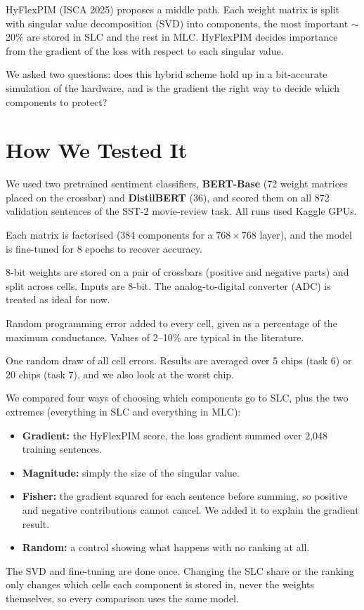 \documentclass[10pt,a4paper]{article}
\begin{document}
HyFlexPIM (ISCA 2025) proposes a middle path. Each weight matrix is split with singular value
decomposition (SVD) into components, the most important $\sim$20\% are stored in SLC and the rest in MLC.
HyFlexPIM decides importance from the gradient of the loss with respect to each singular value.

We asked two questions: does this hybrid scheme hold up in a bit-accurate simulation of the hardware,
and is the gradient the right way to decide which components to protect?

\section{How We Tested It}
We used two pretrained sentiment classifiers, \textbf{BERT-Base} (72 weight matrices placed on the
crossbar) and \textbf{DistilBERT} (36), and scored them on all 872 validation sentences of the SST-2
movie-review task. All runs used Kaggle GPUs.

\begin{description}[leftmargin=1.2em,labelindent=0pt]
\item[SVD step.] Each matrix is factorised (384 components for a $768\times768$ layer), and the model is
fine-tuned for 8 epochs to recover accuracy.
\item[Simulator.] 8-bit weights are stored on a pair of crossbars (positive and negative parts) and split
across cells. Inputs are 8-bit. The analog-to-digital converter (ADC) is treated as ideal for now.
\item[Noise $\sigma$.] Random programming error added to every cell, given as a percentage of the maximum
conductance. Values of 2--10\% are typical in the literature.
\item[Simulated chip.] One random draw of all cell errors. Results are averaged over 5 chips (task 6) or
20 chips (task 7), and we also look at the worst chip.
\end{description}

\noindent We compared four ways of choosing which components go to SLC, plus the two extremes (everything
in SLC and everything in MLC):
\begin{itemize}
\item \textbf{Gradient:} the HyFlexPIM score, the loss gradient summed over 2{,}048 training sentences.
\item \textbf{Magnitude:} simply the size of the singular value.
\item \textbf{Fisher:} the gradient squared for each sentence before summing, so positive and negative
contributions cannot cancel. We added it to explain the gradient result.
\item \textbf{Random:} a control showing what happens with no ranking at all.
\end{itemize}
The SVD and fine-tuning are done once. Changing the SLC share or the ranking only changes which cells
each component is stored in, never the weights themselves, so every comparison uses the same model.
\end{document}
